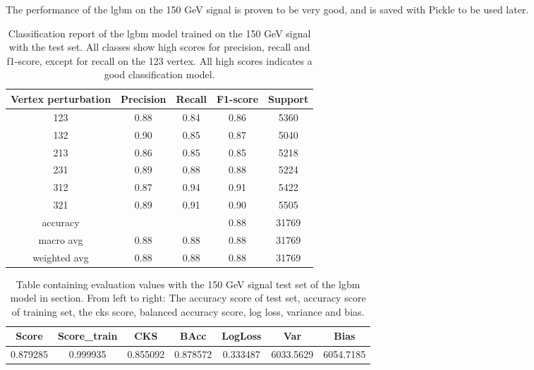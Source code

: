 \documentclass[a4paper, american, 12pt]{report}
\begin{document}
	The performance of the \acrshort{lgbm} on the 150 GeV signal is proven to be very good, and is saved with Pickle to be used later.
	
	\begin{table}[htb!]
		\centering
		\begin{tabular}{ |c|c|c|c|c| }
			\hline \rule{0pt}{13pt}
			Vertex perturbation & Precision & Recall & F1-score & Support \\
			\hline \rule{0pt}{13pt}
			123 & 0.88 & 0.84 & 0.86 & 5360 \\
			\hline \rule{0pt}{13pt}
			132 & 0.90 & 0.85 & 0.87 & 5040 \\
			\hline \rule{0pt}{13pt}
			213 & 0.86 & 0.85 & 0.85 & 5218 \\
			\hline \rule{0pt}{13pt}
			231 & 0.89 & 0.88 & 0.88 & 5224  \\
			\hline \rule{0pt}{13pt}
			312 & 0.87 & 0.94 & 0.91 & 5422 \\
			\hline \rule{0pt}{13pt}
			321 & 0.89 & 0.91 & 0.90 & 5505 \\
			\hline \rule{0pt}{13pt}
			accuracy &   &   &  0.88 & 31769 \\
			\hline \rule{0pt}{13pt}
			macro avg & 0.88 & 0.88 & 0.88 & 31769 \\
			\hline \rule{0pt}{13pt}
			weighted avg & 0.88 & 0.88 & 0.88 & 31769 \\
			\hline
		\end{tabular}	         
		\caption[Classification report of the \acrshort{lgbm} model trained on the 150 GeV signal.]{Classification report of the \acrshort{lgbm} model trained on the 150 GeV signal with the test set. All classes show high scores for precision, recall and f1-score, except for recall on the 123 vertex. All high scores indicates a good classification model.}
		\label{tab:ClassReport_150}
	\end{table}
	
	\begin{table}[htb!]
		\hspace{-0.8cm}
		\begin{tabular}{ |c|c|c|c|c|c|c| }
			\hline \rule{0pt}{13pt}
			Score & Score\_train & CKS & BAcc & LogLoss & Var & Bias \\
			\hline \rule{0pt}{13pt}
			0.879285 & 0.999935 & 0.855092 & 0.878572 &  0.333487 & 6033.5629 & 6054.7185 \\
			\hline
		\end{tabular}	         
		\caption[Evaluation with 150 Gev signal test set.]{Table containing evaluation values with the 150 GeV signal test set of the \acrshort{lgbm} model in section. From left to right: The accuracy score of test set, accuracy score of training set, the \acrshort{cks} score, balanced accuracy score, log loss, variance and bias.}
		\label{tab:Test_150}
	\end{table}
\end{document}
